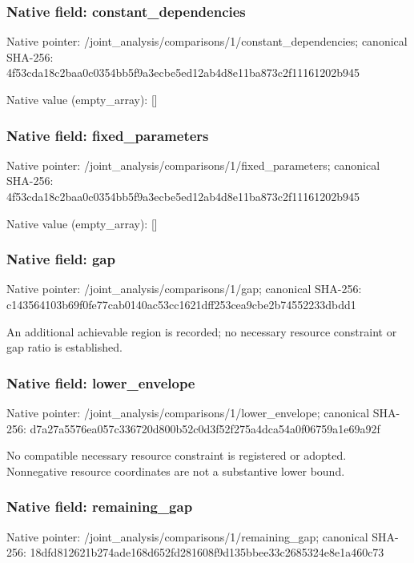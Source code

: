 \documentclass[10pt,a4paper]{article}
\begin{document}
\subsubsection{Native field: constant\_\allowbreak{}dependencies}
Native pointer: /joint\_\allowbreak{}analysis/comparisons/1/constant\_\allowbreak{}dependencies; canonical SHA-256: 4f53cda18c2baa0c0354bb5f9a3ecbe5ed12ab4d8e11ba873c2f11161202b945

Native value (empty\_\allowbreak{}array): []

\subsubsection{Native field: fixed\_\allowbreak{}parameters}
Native pointer: /joint\_\allowbreak{}analysis/comparisons/1/fixed\_\allowbreak{}parameters; canonical SHA-256: 4f53cda18c2baa0c0354bb5f9a3ecbe5ed12ab4d8e11ba873c2f11161202b945

Native value (empty\_\allowbreak{}array): []

\subsubsection{Native field: gap}
Native pointer: /joint\_\allowbreak{}analysis/comparisons/1/gap; canonical SHA-256: c143564103b69f0fe77cab0140ac53cc1621dff253cea9cbe2b74552233dbdd1

\begingroup\raggedright\sloppy An additional achievable region is recorded;\allowbreak{} no necessary resource constraint or gap ratio is established.\par\endgroup

\subsubsection{Native field: lower\_\allowbreak{}envelope}
Native pointer: /joint\_\allowbreak{}analysis/comparisons/1/lower\_\allowbreak{}envelope; canonical SHA-256: d7a27a5576ea057c336720d800b52c0d3f52f275a4dca54a0f06759a1e69a92f

\begingroup\raggedright\sloppy No compatible necessary resource constraint is registered or adopted. Nonnegative resource coordinates are not a substantive lower bound.\par\endgroup

\subsubsection{Native field: remaining\_\allowbreak{}gap}
Native pointer: /joint\_\allowbreak{}analysis/comparisons/1/remaining\_\allowbreak{}gap; canonical SHA-256: 18dfd812621b274ade168d652fd281608f9d135bbee33c2685324e8e1a460c73
\end{document}
